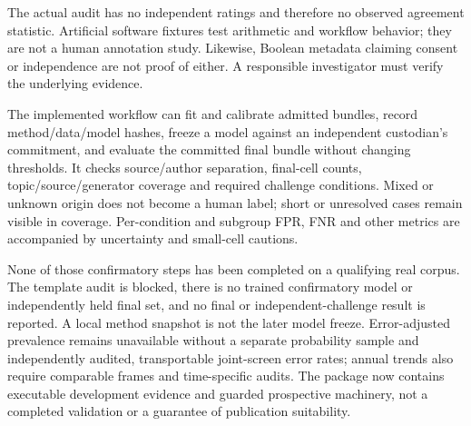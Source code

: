 The actual audit has no independent ratings and therefore no observed agreement
statistic. Artificial software fixtures test arithmetic and workflow behavior;
they are not a human annotation study. Likewise, Boolean metadata claiming
consent or independence are not proof of either. A responsible investigator
must verify the underlying evidence.

The implemented workflow can fit and calibrate admitted bundles, record
method/data/model hashes, freeze a model against an independent custodian's
commitment, and evaluate the committed final bundle without changing thresholds.
It checks source/author separation, final-cell counts, topic/source/generator
coverage and required challenge conditions. Mixed or unknown origin does not
become a human label; short or unresolved cases remain visible in coverage.
Per-condition and subgroup FPR, FNR and other metrics are accompanied by
uncertainty and small-cell cautions.

None of those confirmatory steps has been completed on a qualifying real corpus.
The template audit is blocked, there is no trained confirmatory model or
independently held final set, and no final or independent-challenge result is
reported. A local method snapshot is not the later model freeze. Error-adjusted
prevalence remains unavailable without a separate probability sample and
independently audited, transportable joint-screen error rates; annual trends
also require comparable frames and time-specific audits. The package now
contains executable development evidence and guarded prospective machinery,
not a completed validation or a guarantee of publication suitability.